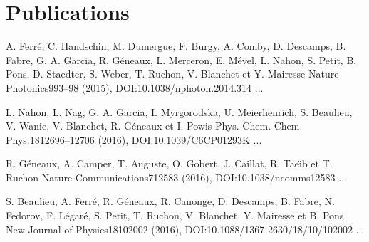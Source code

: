 \part*{Publications}




{A. Ferré, C. Handschin, M. Dumergue, F. Burgy, A. Comby, D. Descamps, B. Fabre, G. A. Garcia, R. Géneaux, L. Merceron, E. Mével, L. Nahon, S. Petit, B. Pons, D. Staedter, S. Weber, T. Ruchon, V. Blanchet et Y. Mairesse} 
{Nature Photonics}{9}{93–98 (2015), DOI:10.1038/nphoton.2014.314}
{...}
\par\noindent

{L. Nahon, L. Nag, G. A. Garcia, I. Myrgorodska, U. Meierhenrich, S. Beaulieu, V. Wanie, V. Blanchet, R. Géneaux et I. Powis} 
{Phys. Chem. Chem. Phys.}{18}{12696–12706 (2016), DOI:10.1039/C6CP01293K}
{...}
\par\noindent

{R. G\'eneaux, A. Camper, T. Auguste, O. Gobert, J. Caillat, R. Tae{\"\i}b et T. Ruchon} 
{Nature Communications}{7}{12583 (2016), DOI:10.1038/ncomms12583}
{...}
\par\noindent

{S. Beaulieu, A. Ferré, R. Géneaux, R. Canonge, D. Descamps, B. Fabre, N. Fedorov, F. Légaré, S. Petit, T. Ruchon, V. Blanchet, Y. Mairesse et B. Pons} 
{New Journal of Physics}{18}{102002 (2016), DOI:10.1088/1367-2630/18/10/102002}
{...}
\par\noindent